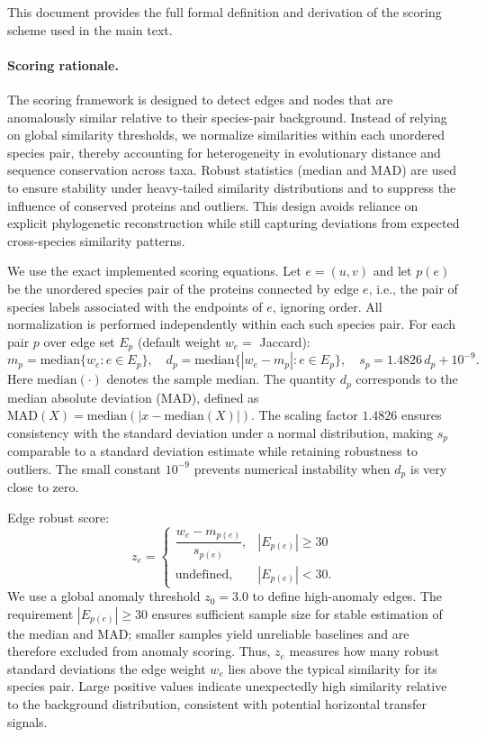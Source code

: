 \documentclass[11pt]{article}
\begin{document}
\noindent This document provides the full formal definition and derivation of the scoring scheme used in the main text.

\paragraph{Scoring rationale.}
The scoring framework is designed to detect edges and nodes that are anomalously similar relative to their species-pair background. 
Instead of relying on global similarity thresholds, we normalize similarities within each unordered species pair, thereby accounting for heterogeneity in evolutionary distance and sequence conservation across taxa. 
Robust statistics (median and MAD) are used to ensure stability under heavy-tailed similarity distributions and to suppress the influence of conserved proteins and outliers. This design avoids reliance on explicit phylogenetic reconstruction while still capturing deviations from expected cross-species similarity patterns.

\vspace{0.5em}
We use the exact implemented scoring equations. Let $e=(u,v)$ and let $p(e)$ be the unordered species pair of the proteins connected by edge $e$, i.e., the pair of species labels associated with the endpoints of $e$, ignoring order. All normalization is performed independently within each such species pair.
For each pair $p$ over edge set $E_p$ (default weight $w_e=$ Jaccard):
\begin{equation}
m_p=\mathrm{median}\{w_e:e\in E_p\},\quad
d_p=\mathrm{median}\{|w_e-m_p|:e\in E_p\},\quad
s_p=1.4826\,d_p+10^{-9}.
\end{equation}
Here $\mathrm{median}(\cdot)$ denotes the sample median. The quantity $d_p$ corresponds to the median absolute deviation (MAD), defined as $\mathrm{MAD}(X)=\mathrm{median}(|x - \mathrm{median}(X)|)$.
The scaling factor $1.4826$ ensures consistency with the standard deviation under a normal distribution, making $s_p$ comparable to a standard deviation estimate while retaining robustness to outliers. 
The small constant $10^{-9}$ prevents numerical instability when $d_p$ is very close to zero.

\vspace{0.5em}
Edge robust score:
\begin{equation}
z_e=
\begin{cases}
\dfrac{w_e-m_{p(e)}}{s_{p(e)}}, & |E_{p(e)}|\ge 30\\
\text{undefined}, & |E_{p(e)}|<30.
\end{cases}
\end{equation}
We use a global anomaly threshold $z_0=3.0$ to define high-anomaly edges. The requirement $|E_{p(e)}|\ge 30$ ensures sufficient sample size for stable estimation of the median and MAD; smaller samples yield unreliable baselines and are therefore excluded from anomaly scoring.
Thus, $z_e$ measures how many robust standard deviations the edge weight $w_e$ lies above the typical similarity for its species pair. 
Large positive values indicate unexpectedly high similarity relative to the background distribution, consistent with potential horizontal transfer signals.
\end{document}
